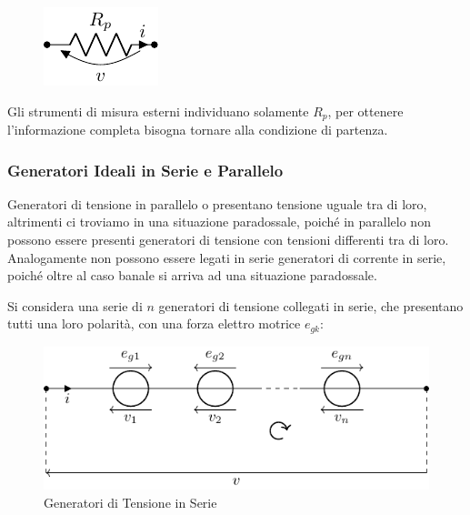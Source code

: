 \documentclass{article}
\numberwithin{equation}{subsection}
\begin{document}
\begin{figure}[H]%
    \centering
    \includegraphics{resistori-parallelo-equivalente.pdf}%
    \label{fig:resistori-parallelo-equivalente}
\end{figure}

Gli strumenti di misura esterni individuano solamente $R_p$, per ottenere l'informazione completa bisogna tornare alla condizione di partenza. 

\subsubsection{Generatori Ideali in Serie e Parallelo}

Generatori di tensione in parallelo o presentano tensione uguale tra di loro, altrimenti ci troviamo in una situazione paradossale, poiché in parallelo non possono essere presenti 
generatori di tensione con tensioni differenti tra di loro. Analogamente non possono essere legati in serie generatori di corrente in serie, poiché oltre al caso banale si 
arriva ad una situazione paradossale. 


Si considera una serie di $n$ generatori di tensione collegati in serie, che presentano tutti una loro polarità, con una forza elettro motrice $e_{gk}$:  
\begin{figure}[H]%
    \centering
    \includegraphics{generatore-tensione-serie.pdf}%
    \caption{Generatori di Tensione in Serie}%
    \label{fig:generatori-tensione-serie}
\end{figure}
\end{document}
